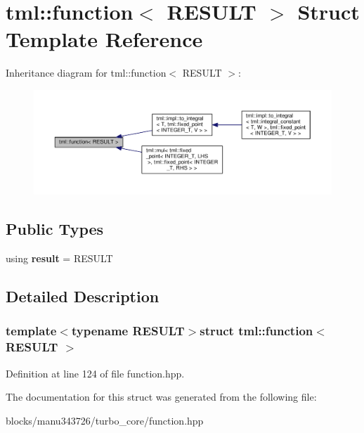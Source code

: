\hypertarget{structtml_1_1function}{\section{tml\+:\+:function$<$ R\+E\+S\+U\+L\+T $>$ Struct Template Reference}
\label{structtml_1_1function}
}


Inheritance diagram for tml\+:\+:function$<$ R\+E\+S\+U\+L\+T $>$\+:
\nopagebreak
\begin{figure}[H]
\begin{center}
\leavevmode
\includegraphics[width=350pt]{structtml_1_1function__inherit__graph}
\end{center}
\end{figure}
\subsection*{Public Types}
\begin{DoxyCompactItemize}
\item 
\hypertarget{structtml_1_1function_a8c4d7302397a7d0081d386313fa78d9b}{using {\bfseries result} = R\+E\+S\+U\+L\+T}\label{structtml_1_1function_a8c4d7302397a7d0081d386313fa78d9b}

\end{DoxyCompactItemize}


\subsection{Detailed Description}
\subsubsection*{template$<$typename R\+E\+S\+U\+L\+T$>$struct tml\+::function$<$ R\+E\+S\+U\+L\+T $>$}



Definition at line 124 of file function.\+hpp.



The documentation for this struct was generated from the following file\+:\begin{DoxyCompactItemize}
\item 
blocks/manu343726/turbo\+\_\+core/function.\+hpp\end{DoxyCompactItemize}
